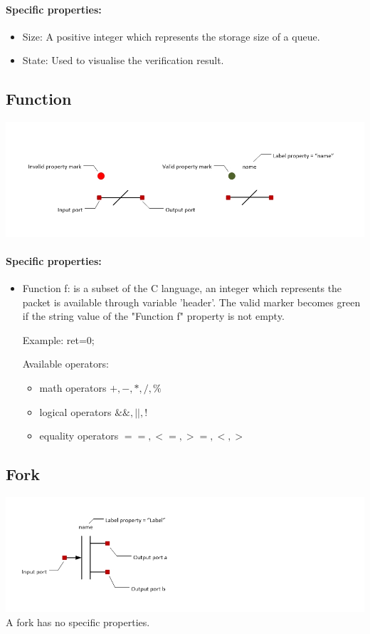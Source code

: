 \documentclass[a4paper,11pt,final]{article}
\begin{document}
\paragraph{Specific properties:}
\begin{itemize}
\item Size: A positive integer which represents the storage size of a queue.
\item State: Used to visualise the verification result.
\end{itemize}

\subsection{Function}
\includegraphics[width=1.0\textwidth]{function}
\paragraph{Specific properties:}
\begin{itemize}
\item Function f: is a subset of the C language, an integer which represents the packet is available through variable 'header'.
The valid marker becomes green if the  string value of the "Function f" property is not empty.

Example: ret=0;

Available operators:
\begin{itemize}
\item math operators $+,-,*,/,\%$
\item logical operators $\&\&,||,!$
\item equality operators $==,<=,>=,<,>$
\end{itemize}
\end{itemize}


\subsection{Fork}
\includegraphics[width=1.0\textwidth]{fork}
A fork has no specific properties.
\end{document}

